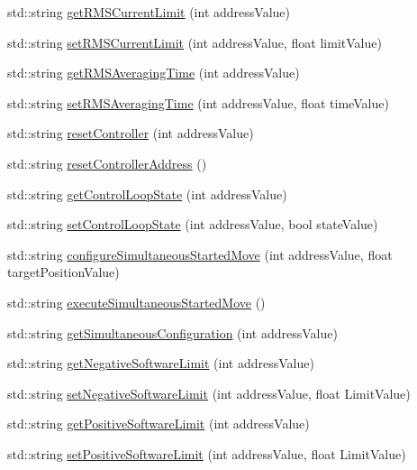 \begin{DoxyCompactItemize}
std\+::string \hyperlink{namespaceconex_a7f0202ac44e29e633656eac06ca43cd0}{get\+R\+M\+S\+Current\+Limit} (int address\+Value)
\item 
std\+::string \hyperlink{namespaceconex_a3552f23ef324fc207a4b8ea8ca79d63c}{set\+R\+M\+S\+Current\+Limit} (int address\+Value, float limit\+Value)
\item 
std\+::string \hyperlink{namespaceconex_a7c219ac12ae0d8c2385cbf3ef5aa2ed2}{get\+R\+M\+S\+Averaging\+Time} (int address\+Value)
\item 
std\+::string \hyperlink{namespaceconex_a4db096ebf48bf2512a51c6f16f6d05a5}{set\+R\+M\+S\+Averaging\+Time} (int address\+Value, float time\+Value)
\item 
std\+::string \hyperlink{namespaceconex_ac817039b6d386eae2ff9b288bee8c8f6}{reset\+Controller} (int address\+Value)
\item 
std\+::string \hyperlink{namespaceconex_a4dd4ee5bd3729fc3cbf6e6f70f141baf}{reset\+Controller\+Address} ()
\item 
std\+::string \hyperlink{namespaceconex_a50aafea583b1e9883f5c9da70f84e572}{get\+Control\+Loop\+State} (int address\+Value)
\item 
std\+::string \hyperlink{namespaceconex_a617d632120418b5c8f501221c4b3c4e7}{set\+Control\+Loop\+State} (int address\+Value, bool state\+Value)
\item 
std\+::string \hyperlink{namespaceconex_a5fe4df9385c4ac7842eee6c04fa6bda6}{configure\+Simultaneous\+Started\+Move} (int address\+Value, float target\+Position\+Value)
\item 
std\+::string \hyperlink{namespaceconex_a2502bb0dfe401313b2505e560b41c8d5}{execute\+Simultaneous\+Started\+Move} ()
\item 
std\+::string \hyperlink{namespaceconex_a66d5bce36b76f68906f18e8a553b07ea}{get\+Simultaneous\+Configuration} (int address\+Value)
\item 
std\+::string \hyperlink{namespaceconex_a90e63f39f299603adfbab034098ae702}{get\+Negative\+Software\+Limit} (int address\+Value)
\item 
std\+::string \hyperlink{namespaceconex_a70c1cfd0edc011bcf941ed9c4a63efe2}{set\+Negative\+Software\+Limit} (int address\+Value, float Limit\+Value)
\item 
std\+::string \hyperlink{namespaceconex_ac78edbc8a18860189cd3963fb2b543f2}{get\+Positive\+Software\+Limit} (int address\+Value)
\item 
std\+::string \hyperlink{namespaceconex_a786f1251f31ef6a30a042ac4fdbfb815}{set\+Positive\+Software\+Limit} (int address\+Value, float Limit\+Value)

\end{DoxyCompactItemize}
